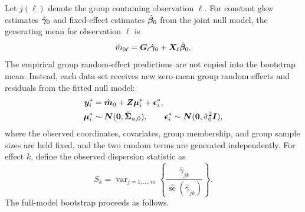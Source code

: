 \documentclass[times]{interact}
\theoremstyle{plain}%
\theoremstyle{definition}
\theoremstyle{remark}
\begin{document}
Let $j(\ell)$ denote the group containing observation $\ell$.
For constant \gls{glsw} estimates $\hat{\bm{\gamma}}_0$ and fixed-effect estimates $\hat{\bm{\beta}}_0$ from the joint null model, the generating mean for observation $\ell$ is
\begin{equation}\label{equ:glsw-full-bootstrap-mean}
  \hat{m}_{0\ell}
  = \bm{G}_{\ell} \hat{\bm{\gamma}}_{0}
  + \bm{X}_{\ell} \hat{\bm{\beta}}_{0}.
\end{equation}
The empirical group random-effect predictions are not copied into the bootstrap mean.
Instead, each data set receives new zero-mean group random effects and residuals from the fitted null model:
\begin{equation}\label{equ:glsw-bootvar-error-distribution}
  \begin{split}
    \bm{y}_i^* &= \hat{\bm{m}}_0+\bm{Z}\bm{\mu}_i^*+\bm{\epsilon}_i^*,\\
    \bm{\mu}_i^* &\sim \bm{N}(\bm{0},\hat{\boldsymbol{\Sigma}}_{u,0}),
    \qquad
    \bm{\epsilon}_i^* \sim \bm{N}(\bm{0},\hat{\sigma}_0^2\bm{I}),
  \end{split}
\end{equation}
where the observed coordinates, covariates, group membership, and group sample sizes are held fixed, and the two random terms are generated independently.
For effect $k$, define the observed dispersion statistic as
\begin{equation}\label{equ:glsw-full-bootstrap-statistic}
  S_k
  = \operatorname{var}_{j=1,\ldots,m}
  \left\{
    \frac{\hat{\gamma}_{jk}}
         {\widehat{\operatorname{se}}(\hat{\gamma}_{jk})}
  \right\}.
\end{equation}
The full-model bootstrap proceeds as follows.
\end{document}
